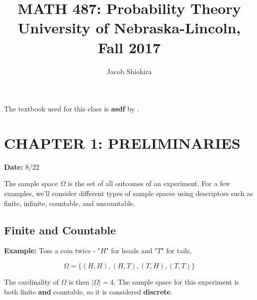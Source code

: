 \documentclass[12pt]{article}
\begin{document}
\title{%
  MATH 487: Probability Theory \\
  \large University of Nebraska-Lincoln, Fall 2017}
\author{Jacob Shiohira}
\maketitle

\vspace*{3cm}

\noindent
The textbook used for this class is \textbf{asdf} by .

\newpage

\section*{CHAPTER 1: PRELIMINARIES}

\begin{flushright}
\textbf{Date:} $8/22$ 
\end{flushright}

\noindent
The sample space $\Omega$ is the set of all outcomes of an experiment. For a few examples, we'll consider different types of sample spaces using descriptors such as finite, infinite, countable, and uncountable.

\vspace{.3cm}
\subsection*{Finite and Countable}
\begin{tcolorbox}
\textbf{Example:} Toss a coin twice - "$H$" for heads and "$T$" for tails,

\begin{equation*}
\Omega = \big \{ (H,H), (H,T), (T,H), (T,T) \big \}
\end{equation*}

\noindent
The cardinality of $\Omega$ is then $|\Omega|=4$. The sample space for this experiment is both finite \textbf{and} countable, so it is considered \textbf{discrete}.
\end{tcolorbox}
\end{document}
